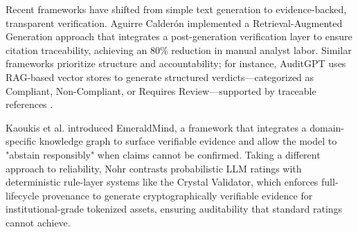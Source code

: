 \documentclass{article}
\begin{document}
Recent frameworks have shifted from simple text generation to evidence-backed, transparent verification. Aguirre Calderón  \parencite{juan_aguirre_calder_n_5eae82e0} implemented a Retrieval-Augmented Generation approach that integrates a post-generation verification layer to ensure citation traceability, achieving an 80\% reduction in manual analyst labor. Similar frameworks prioritize structure and accountability; for instance, AuditGPT uses RAG-based vector stores to generate structured verdicts—categorized as Compliant, Non-Compliant, or Requires Review—supported by traceable references  \parencite{abhijeet_b__moghe_963e6c96}.

Kaoukis et al.  \parencite{kaoukis__georgios_35bab107} introduced EmeraldMind, a framework that integrates a domain-specific knowledge graph to surface verifiable evidence and allow the model to "abstain responsibly" when claims cannot be confirmed. Taking a different approach to reliability, Nohr  \parencite{steven_paul_nohr_a6874924} contrasts probabilistic LLM ratings with deterministic rule-layer systems like the Crystal Validator, which enforces full-lifecycle provenance to generate cryptographically verifiable evidence for institutional-grade tokenized assets, ensuring auditability that standard ratings cannot achieve.
\end{document}

